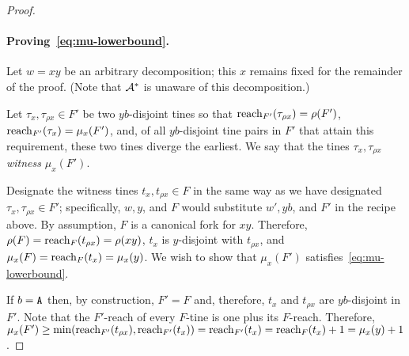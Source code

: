 \begin{proof}
  \paragraph{Proving~\eqref{eq:mu-lowerbound}.} 
  Let $w = xy$ be an arbitrary decomposition; 
  this $x$ remains fixed for the remainder of the proof. 
  (Note that $\mathcal{A}^*$ is unaware of this decomposition.) 
  

  Let $\tau_x, \tau_{\rho x} \in F'$ be two $yb$-disjoint tines 
  so that 
  $\operatorname{reach}_{F'}(\tau_{\rho x}) = \rho(F')$, 
  $\operatorname{reach}_{F'}(\tau_x) = \mu_x(F')$, 
  and, of all $yb$-disjoint tine pairs in $F'$
  that attain this requirement, 
  these two tines diverge the earliest. 
  We say that the tines $\tau_x, \tau_{\rho x}$ \emph{witness} $\mu_x(F')$. 


  Designate the witness tines $t_x, t_{\rho x} \in F$ 
  in the same way as we have designated $\tau_x, \tau_{\rho x} \in F'$; 
  specifically, 
  $w, y$, and $F$ would substitute $w', yb$, and $F'$ 
  in the recipe above. 
  By assumption, $F$ is a canonical fork for $xy$. 
  Therefore, 
  $\rho(F) = \operatorname{reach}_F(t_{\rho x}) = \rho(xy)$, 
  $t_x$ is $y$-disjoint with $t_{\rho x}$, 
  and 
  $\mu_x(F) = \operatorname{reach}_F(t_x) = \mu_x(y)$. 
  We wish to show that 
  $\mu_x(F')$ satisfies~\eqref{eq:mu-lowerbound}. 

  If $b = \mathtt{A}$ then, by construction,
  $F' = F$ and, therefore,
  $t_x$ and $t_{\rho x}$ are $yb$-disjoint in $F'$.
  Note that the $F'$-reach of every $F$-tine is one plus its $F$-reach. 
  Therefore, 
  $
  \mu_x(F') 
  \geq \min(\operatorname{reach}_{F'}(t_{\rho x}), \operatorname{reach}_{F'}(t_x))
  = \operatorname{reach}_{F'}(t_x)
  = \operatorname{reach}_F(t_x) + 1
  = \mu_x(y) + 1
  $. 



\end{proof}
